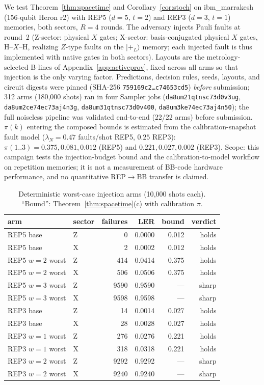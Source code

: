 \documentclass[11pt,a4paper]{article}
\begin{document}
We test Theorem~\ref{thm:spacetime} and Corollary~\ref{cor:stoch} on
ibm\_marrakesh (156-qubit Heron r2) with REP5 ($d{=}5$, $t{=}2$) and
REP3 ($d{=}3$, $t{=}1$) memories, both sectors, $R{=}4$ rounds.
The adversary injects Pauli faults at round~2 (Z-sector: physical $X$
gates; X-sector: basis-conjugated physical $X$ gates, H--$X$--H, realizing
$Z$-type faults on the $\lvert +_L \rangle$ memory; each injected fault is
thus implemented with native gates in both sectors). Layouts are the metrology-selected B-lines of
Appendix~\ref{app:activeprov}, fixed across all arms so that injection
is the only varying factor. Predictions, decision rules, seeds,
layouts, and circuit digests were pinned (SHA-256
\texttt{759169c2\dots c74653cd5}) \emph{before} submission; 312 arms
(180{,}000 shots) ran in four Sampler jobs
(\texttt{da8um21qtnsc73d0v3ug}, \texttt{da8um2ce74ec73aj4n3g},
\texttt{da8um31qtnsc73d0v400}, \texttt{da8um3ke74ec73aj4n50}); the full
noiseless pipeline was validated end-to-end (22/22 arms) before
submission. $\pi(k)$ entering the composed bounds is estimated from the
calibration-snapshot fault model ($\lambda_N{=}0.47$ faults/shot REP5,
$0.25$ REP3): $\pi(1..3)=0.375, 0.081, 0.012$ (REP5) and
$0.221, 0.027, 0.002$ (REP3). Scope: this campaign tests the
injection-budget bound and the calibration-to-model workflow on
repetition memories; it is not a measurement of BB-code hardware
performance, and no quantitative REP$\to$BB transfer is claimed.

\begin{table}[H]\centering\small
\caption{Deterministic worst-case injection arms (10{,}000 shots each).
``Bound'': Theorem~\ref{thm:spacetime}(c) with calibration $\pi$.}
\label{tab:injdet}
\begin{tabular}{@{}llrrrr@{}}
\toprule
arm & sector & failures & LER & bound & verdict \\\midrule
REP5 base & Z & 0 & 0.0000 & 0.012 & holds \\
REP5 base & X & 2 & 0.0002 & 0.012 & holds \\
REP5 $w{=}2$ worst & Z & 414 & 0.0414 & 0.375 & holds \\
REP5 $w{=}2$ worst & X & 506 & 0.0506 & 0.375 & holds \\
REP5 $w{=}3$ worst & Z & 9590 & 0.9590 & --- & sharp \\
REP5 $w{=}3$ worst & X & 9598 & 0.9598 & --- & sharp \\
REP3 base & Z & 14 & 0.0014 & 0.027 & holds \\
REP3 base & X & 28 & 0.0028 & 0.027 & holds \\
REP3 $w{=}1$ worst & Z & 276 & 0.0276 & 0.221 & holds \\
REP3 $w{=}1$ worst & X & 318 & 0.0318 & 0.221 & holds \\
REP3 $w{=}2$ worst & Z & 9292 & 0.9292 & --- & sharp \\
REP3 $w{=}2$ worst & X & 9240 & 0.9240 & --- & sharp \\\bottomrule
\end{tabular}
\end{table}
\end{document}
